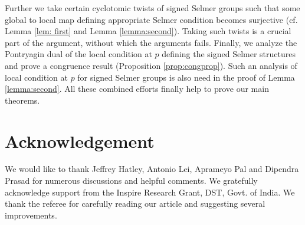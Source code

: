 \documentclass{amsart}
\newtheorem{auxiliary proposition}[theorem]{Auxiliary Proposition}
\newtheorem{main conjecture}[theorem]{Main Conjecture}
\newtheorem{main theorem}[theorem]{Main Theorem}
\newtheorem{modesty proposition}[theorem]{Modesty Proposition}
\newtheorem{open problem}[theorem]{Open Problem}
\newtheorem{convergence lemma}[theorem]{Convergence Lemma}
\newtheorem{corrected lemma}[theorem]{Corrected Lemma}
\newtheorem{growth lemma}[theorem]{Growth Lemma}
\newtheorem{coefficient lemma}[theorem]{Integrality Lemma}
\newtheorem{interpolation lemma}[theorem]{Interpolation Lemma}
\newtheorem{kernel lemma}[theorem]{Kernel Lemma}
\newtheorem{limit lemma}[theorem]{Limit Lemma}
\newtheorem{tandem lemma}[theorem]{Modesty Lemma}
\newtheorem{zero-finding lemma}[theorem]{Zero-Finding Lemma}
\begin{document}
Further we take certain cyclotomic twists of signed Selmer groups such that some global to local map defining appropriate Selmer condition becomes surjective (cf. Lemma \ref{lem: first} and Lemma \ref{lemma:second}). Taking such twists is a crucial part of the argument, without which the arguments fails. Finally, we analyze the Pontryagin dual of the local condition at $p$ defining the signed Selmer structures and prove a congruence result (Proposition \ref{prop:congprop}). Such an analysis of local condition at $p$ for signed Selmer groups is also need in the proof of Lemma \ref{lemma:second}. All these combined efforts finally help  to prove our main theorems. 







\section*{Acknowledgement}
We would like to thank Jeffrey Hatley, Antonio Lei, Aprameyo Pal and Dipendra Prasad for numerous discussions and helpful comments. We gratefully acknowledge support from the Inspire Research Grant, DST, Govt. of India. 
We thank the referee for carefully reading our article and suggesting several improvements.
\end{document}
